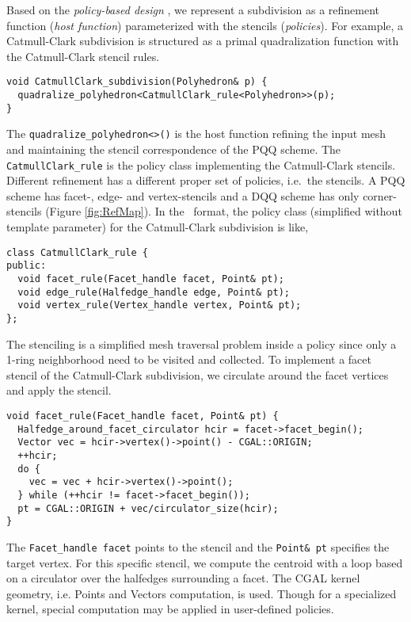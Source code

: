 Based on the \emph{policy-based design} \cite{Alexandrescu:2001:MCD}, 
we represent a subdivision as a refinement function 
(\emph{host function}) parameterized with the stencils
(\emph{policies}). For example, a Catmull-Clark subdivision
is structured as a primal quadralization function with the 
Catmull-Clark stencil rules.
\begin{lstlisting}
void CatmullClark_subdivision(Polyhedron& p) {
  quadralize_polyhedron<CatmullClark_rule<Polyhedron>>(p);
}
\end{lstlisting}
The \lstinline!quadralize_polyhedron<>()! is the host function
refining the input mesh and maintaining the stencil 
correspondence of the PQQ scheme. The \lstinline!CatmullClark_rule!
is the policy class implementing the Catmull-Clark stencils. 
Different refinement has a different proper set of policies, 
i.e.\ the stencils. A PQQ scheme has facet-, edge- and vertex-stencils 
and a DQQ scheme has only corner-stencils (Figure \ref{fig:RefMap}).
In the \CC\ format, the policy class (simplified without template 
parameter) for the Catmull-Clark subdivision 
is like,
\begin{lstlisting}
class CatmullClark_rule {
public:
  void facet_rule(Facet_handle facet, Point& pt);
  void edge_rule(Halfedge_handle edge, Point& pt);
  void vertex_rule(Vertex_handle vertex, Point& pt);
};
\end{lstlisting}
The stenciling is a simplified mesh traversal 
problem inside a policy since only a 1-ring neighborhood 
need to be visited and collected. To implement a facet stencil of the 
Catmull-Clark subdivision, we circulate around 
the facet vertices and apply the stencil.
\begin{lstlisting}
void facet_rule(Facet_handle facet, Point& pt) {
  Halfedge_around_facet_circulator hcir = facet->facet_begin();
  Vector vec = hcir->vertex()->point() - CGAL::ORIGIN;
  ++hcir;
  do {
    vec = vec + hcir->vertex()->point();
  } while (++hcir != facet->facet_begin());
  pt = CGAL::ORIGIN + vec/circulator_size(hcir);
}
\end{lstlisting}
The \lstinline!Facet_handle facet! points to the 
stencil and the \lstinline!Point& pt! specifies the
target vertex. For this specific stencil, we compute the
centroid with a loop based on a circulator over the halfedges
surrounding a facet. The CGAL kernel geometry, i.e. Points 
and Vectors computation, is used. Though for a specialized
kernel, special computation may be applied in user-defined
policies.
 
